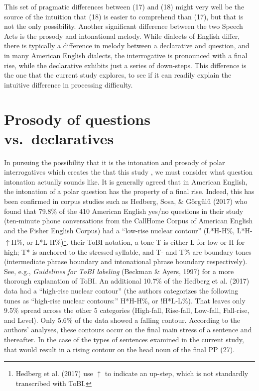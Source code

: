 \documentclass[12pt,oneside]{book}
\let\rmarkdownfootnote\footnote%
\def\footnote{\protect\rmarkdownfootnote}
\begin{document}
This set of pragmatic differences between (17) and (18) might very well be the source of the  intuition that (18) is easier to comprehend than (17),  but that is not the only possibility. Another significant difference between the two Speech Acts is the prosody and intonational melody. While dialects of English differ, there is typically a difference in melody between a declarative and question, and in many American English dialects, the interrogative is pronounced with a final rise, while the declarative exhibits just a series of down-steps. This difference is the one that the current study explores, to see if it can readily explain the intuitive difference in processing difficulty.

\hypertarget{prosody-of-questions-vs.-declaratives}{%
\section{Prosody of questions vs.~declaratives}\label{prosody-of-questions-vs.-declaratives}}

In pursuing the possibility that it is the intonation and prosody of polar interrogatives which creates the  that  this study , we must consider what question intonation actually sounds like. It is generally agreed that in American English, the intonation of a polar  question has the property of a final rise. Indeed, this has been confirmed in corpus studies such as Hedberg, Sosa, \& Görgülü (2017) who found that 79.8\% of the 410 American English yes/no questions in their study (ten-minute phone conversations from the CallHome Corpus of American English and the Fisher English Corpus) had a ``low-rise nuclear contour'' (L*H-H\%, L*H-\(\uparrow\)H\%, or L*L-H\%)\footnote{Hedberg et al. (2017) use \(\uparrow\) to indicate an up-step, which is not standardly transcribed with ToBI.}.  their ToBI notation, a tone T is either L for low or H for high; T* is anchored to the stressed syllable, and T- and T\% are boundary tones (intermediate phrase boundary and intonational phrase boundary respectively). See, e.g., \emph{Guidelines for ToBI labeling} (Beckman \& Ayers, 1997) for a more thorough explanation of ToBI. An additional 10.7\% of the Hedberg et al. (2017) data had a ``high-rise nuclear contour'' (the authors categorizes the following tunes as ``high-rise nuclear contours:'' H*H-H\%, or !H*L-L\%). That leaves only 9.5\% spread across the other 5 categories (High-fall, Rise-fall, Low-fall, Fall-rise, and Level). Only 5.6\% of the data showed a falling contour. According to the authors' analyses, these contours occur on the final main stress of a sentence and thereafter. In the case of the types of sentences examined in the current study, that would result in a rising contour on the head noun of the final PP  (27).
\end{document}
